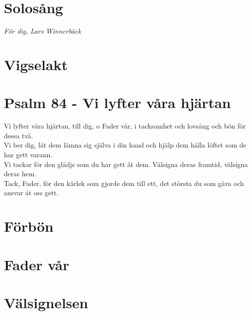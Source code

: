 \documentclass[a5paper, 12pt]{article}
\begin{document}
\begin{center}
	\section{Solosång}
	\vspace{-0.4cm}
	\textit{För dig, Lars Winnerbäck}
	
	
	\section{Vigselakt}
	\vspace{0.4cm}
	
	\section{Psalm 84 - Vi lyfter våra hjärtan}
	Vi lyfter våra hjärtan, till dig, o Fader vår, i tacksamhet och lovsång och bön för dessa två.      \\
	\vspace{0.2cm}
	Vi ber dig, låt dem lämna sig själva i din hand och hjälp dem hålla löftet som de har gett varann.   \\
	\vspace{0.2cm}
	Vi tackar för den glädje som du har gett åt dem. Välsigna deras framtid, välsigna deras hem.         \\
	\vspace{0.2cm}
	Tack, Fader, för den kärlek som gjorde dem till ett, det största du som gåva och ansvar åt oss gett. 

	\vspace{0.2cm}
	\section{Förbön}	
	\vspace{0.4cm}
	
	\section{Fader vår}
	\vspace{0.4cm}
	
	\section{Välsignelsen}	
	\vspace{0.4cm}

	\newpage

\end{center}
\end{document}
